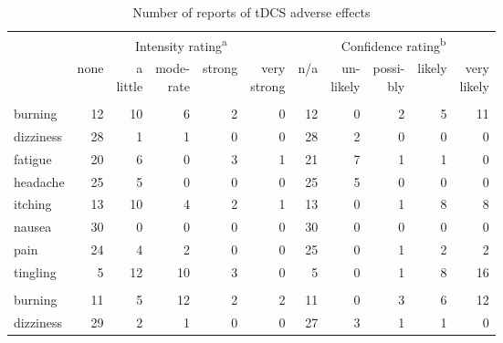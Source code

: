 \documentclass[11pt,english,]{memoir}
\begin{document}
\begin{longtable}{lrrrrrrrrrr}
\caption{\label{tab:tab-sacc-tDCS-AE}Number of reports of tDCS adverse effects}\\
\toprule
\multicolumn{1}{c}{ } & \multicolumn{5}{c}{Intensity rating\textsuperscript{a}} & \multicolumn{5}{c}{Confidence rating\textsuperscript{b}} \\
\cmidrule(l{3pt}r{3pt}){2-6} \cmidrule(l{3pt}r{3pt}){7-11}
  & none & \makecell[c]{a\\little} & \makecell[c]{mode-\\rate} & strong & \makecell[c]{very\\strong} & n/a & \makecell[c]{un-\\likely} & \makecell[c]{possi-\\bly} & likely & \makecell[c]{very\\likely}\\
\midrule
\addlinespace[0.3em]
\multicolumn{11}{l}{\textbf{anodal session}}\\
\hspace{1em}burning & 12 & 10 & 6 & 2 & 0 & 12 & 0 & 2 & 5 & 11\\
\hspace{1em}dizziness & 28 & 1 & 1 & 0 & 0 & 28 & 2 & 0 & 0 & 0\\
\hspace{1em}fatigue & 20 & 6 & 0 & 3 & 1 & 21 & 7 & 1 & 1 & 0\\
\hspace{1em}headache & 25 & 5 & 0 & 0 & 0 & 25 & 5 & 0 & 0 & 0\\
\hspace{1em}itching & 13 & 10 & 4 & 2 & 1 & 13 & 0 & 1 & 8 & 8\\
\hspace{1em}nausea & 30 & 0 & 0 & 0 & 0 & 30 & 0 & 0 & 0 & 0\\
\hspace{1em}pain & 24 & 4 & 2 & 0 & 0 & 25 & 0 & 1 & 2 & 2\\
\hspace{1em}tingling & 5 & 12 & 10 & 3 & 0 & 5 & 0 & 1 & 8 & 16\\
\addlinespace[0.3em]
\multicolumn{11}{l}{\textbf{cathodal session}}\\
\hspace{1em}burning & 11 & 5 & 12 & 2 & 2 & 11 & 0 & 3 & 6 & 12\\
\hspace{1em}dizziness & 29 & 2 & 1 & 0 & 0 & 27 & 3 & 1 & 1 & 0\\

\end{longtable}
\end{document}
